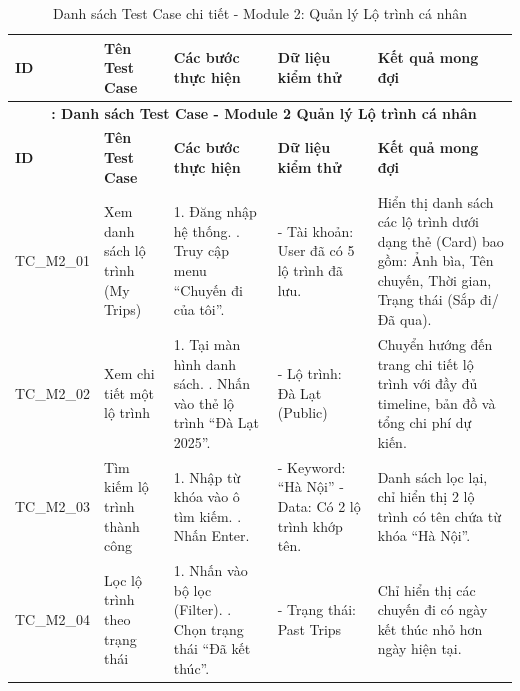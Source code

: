 \begin{landscape}
\begin{longtable}{|p{2.5cm}|p{4.0cm}|p{6.5cm}|p{4.5cm}|p{4.5cm}|}
\end{longtable}

\begin{longtable}{|p{2.5cm}|p{4.0cm}|p{6.5cm}|p{4.5cm}|p{4.5cm}|}

\caption{Danh sách Test Case chi tiết - Module 2: Quản lý Lộ trình cá nhân} \label{tab:tc_module2} \\
\hline
\textbf{ID} & \textbf{Tên Test Case} & \textbf{Các bước thực hiện} & \textbf{Dữ liệu kiểm thử} & \textbf{Kết quả mong đợi} \\
\hline
\endfirsthead

\multicolumn{5}{c}{{\bfseries \tablename\ \thetable{}: Danh sách Test Case - Module 2 Quản lý Lộ trình cá nhân}} \\
\hline
\textbf{ID} & \textbf{Tên Test Case} & \textbf{Các bước thực hiện} & \textbf{Dữ liệu kiểm thử} & \textbf{Kết quả mong đợi} \\
\hline
\endhead

\hline
\endlastfoot


TC\_M2\_01 & Xem danh sách lộ trình (My Trips) & 
1. Đăng nhập hệ thống. \newline 
2. Truy cập menu ``Chuyến đi của tôi''. & 
- Tài khoản: User đã có 5 lộ trình đã lưu. & 
Hiển thị danh sách các lộ trình dưới dạng thẻ (Card) bao gồm: Ảnh bìa, Tên chuyến, Thời gian, Trạng thái (Sắp đi/Đã qua). \\
\hline

TC\_M2\_02 & Xem chi tiết một lộ trình & 
1. Tại màn hình danh sách. \newline 
2. Nhấn vào thẻ lộ trình ``Đà Lạt 2025''. & 
- Lộ trình: Đà Lạt (Public) & 
Chuyển hướng đến trang chi tiết lộ trình với đầy đủ timeline, bản đồ và tổng chi phí dự kiến. \\
\hline

TC\_M2\_03 & Tìm kiếm lộ trình thành công & 
1. Nhập từ khóa vào ô tìm kiếm. \newline 
2. Nhấn Enter. & 
- Keyword: ``Hà Nội'' \newline
- Data: Có 2 lộ trình khớp tên. & 
Danh sách lọc lại, chỉ hiển thị 2 lộ trình có tên chứa từ khóa ``Hà Nội''. \\
\hline

TC\_M2\_04 & Lọc lộ trình theo trạng thái & 
1. Nhấn vào bộ lọc (Filter). \newline 
2. Chọn trạng thái ``Đã kết thúc''. & 
- Trạng thái: Past Trips & 
Chỉ hiển thị các chuyến đi có ngày kết thúc nhỏ hơn ngày hiện tại. \\
\hline


\end{longtable}
\end{landscape}
